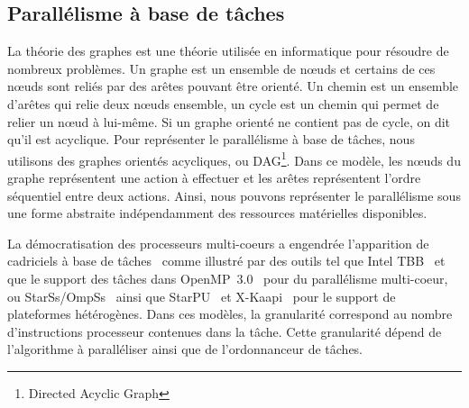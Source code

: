 \subsection{Parallélisme à base de tâches}
La théorie des graphes est une théorie utilisée en informatique pour résoudre de nombreux problèmes.
%
Un graphe est un ensemble de n{\oe}uds et certains de ces n{\oe}uds sont reliés par des arêtes pouvant être orienté.
%
Un chemin est un ensemble d'arêtes qui relie deux n{\oe}uds ensemble, un cycle est un chemin qui permet de relier un n{\oe}ud à lui-même.
%
Si un graphe orienté ne contient pas de cycle, on dit qu'il est acyclique.
%
Pour représenter le parallélisme à base de tâches, nous utilisons des graphes orientés acycliques, ou DAG\footnote{Directed Acyclic Graph}.
%
Dans ce modèle, les n{\oe}uds du graphe représentent une action à effectuer et les arêtes représentent l'ordre séquentiel entre deux actions.
%
Ainsi, nous pouvons représenter le parallélisme sous une forme abstraite indépendamment des ressources matérielles disponibles.


La démocratisation des processeurs multi-coeurs a engendrée l'apparition de cadriciels à base de tâches~\cite{taskscomparison} comme illustré par des outils tel que Intel TBB~\cite{Intel::TBB} et que le support des tâches dans OpenMP~3.0~\cite{openmptasks} pour du parallélisme multi-coeur, ou StarSs/OmpSs~\cite{OMPSs} ainsi que StarPU~\cite{starpu} et X-Kaapi~\cite{xkaapi} pour le support de plateformes hétérogènes.
%
Dans ces modèles, la granularité correspond au nombre d'instructions processeur contenues dans la tâche.
%
Cette granularité dépend de l'algorithme à paralléliser ainsi que de l'ordonnanceur de tâches.
